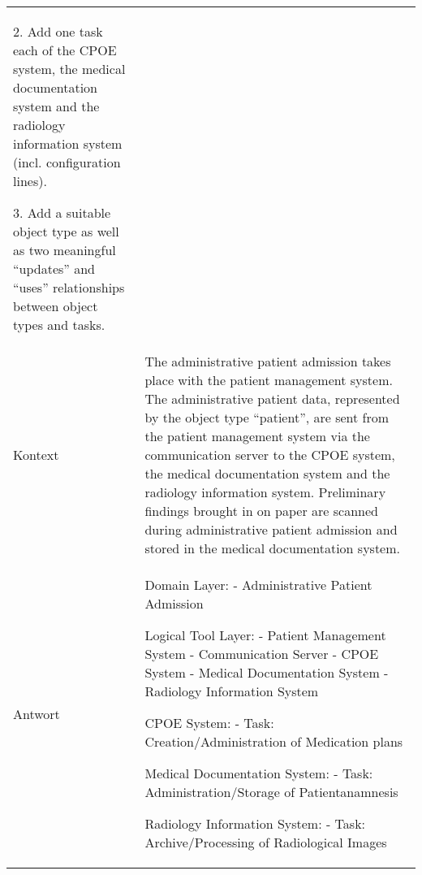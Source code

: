 {\begin{landscape}
\begin{longtable}{p{3cm}p{}}
    2. Add one task each of the CPOE system, the medical documentation system and the radiology information system (incl.
    configuration lines).

    3. Add a suitable object type as well as two meaningful ``updates'' and ``uses'' relationships between object types and tasks.\\
    Kontext & The administrative patient admission takes place with the patient management system.
    The administrative patient data, represented by the object type ``patient'', are sent from the patient management system via the communication server to the CPOE system, the medical documentation system and the radiology information system.
    Preliminary findings brought in on paper are scanned during administrative patient admission and stored in the medical documentation system.\\
    Antwort & Domain Layer:
    - Administrative Patient Admission

    Logical Tool Layer:
    - Patient Management System
    - Communication Server
    - CPOE System
    - Medical Documentation System
    - Radiology Information System


    CPOE System:
    - Task: Creation/Administration of Medication plans

    Medical Documentation System:
    - Task: Administration/Storage of Patientanamnesis

    Radiology Information System:
    - Task: Archive/Processing of Radiological Images


\end{longtable}
\end{landscape}}
